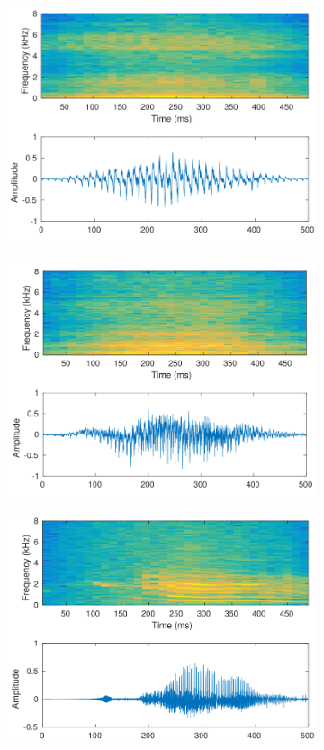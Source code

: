 \begin{figure}[t]
	\centering
	\begin{subfigure}{.40\textwidth}		
		\includegraphics[width=0.9\linewidth]{img/V_spec_crop.pdf}
		\caption{}
		\label{fig:V}
	\end{subfigure}
	\begin{subfigure}{.4\textwidth}
		\includegraphics[width=0.9\linewidth]{img/O_spec_crop.pdf}
		\caption{}
		\label{fig:O}
	\end{subfigure}
	\begin{subfigure}{.40\textwidth}
		\includegraphics[width=0.9\linewidth]{img/T_spec_crop.pdf}

\end{subfigure}
\end{figure}
